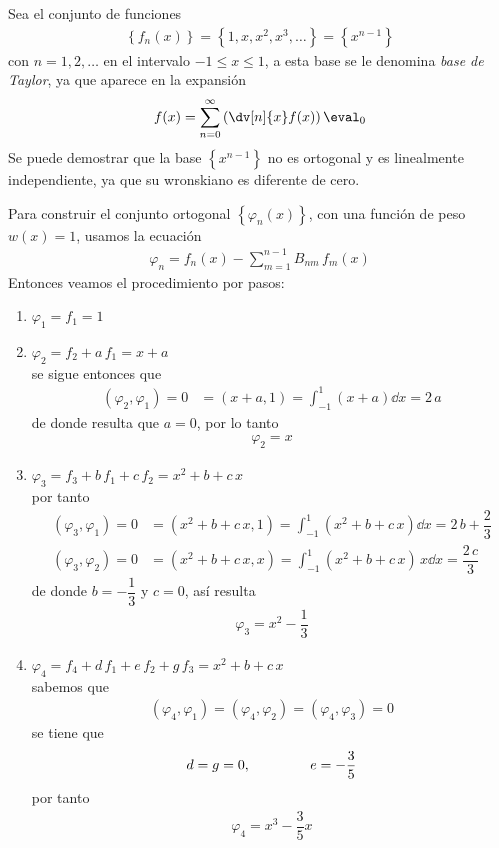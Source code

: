 Sea el conjunto de funciones
\begin{align*}
\left\{ f_{n} (x) \right\} = \left\{ 1, x, x^{2}, x^{3}, \ldots \right\} = \left\{x^{n-1} \right\}
\end{align*}
con $n = 1, 2, \ldots$ en el intervalo $-1 \leq x \leq 1$, a esta base se le denomina \emph{base de Taylor}, ya que aparece en la expansión
\begin{align*}
f(x) = \sum_{n=0}^{\infty} \left( \dv[n]{x} f(x) \right) \eval_{0}
\end{align*}
Se puede demostrar que la base $\left\{x^{n-1} \right\}$ no es ortogonal y es linealmente independiente, ya que su wronskiano es diferente de cero.
\par
Para construir el conjunto ortogonal $\left\{ \varphi_{n} (x) \right\}$, con una función de peso $w(x) = 1$, usamos la ecuación
\begin{align*}
\varphi_{n} = f_{n} (x) - \sum_{m=1}^{n-1} B_{nm} \, f_{m} (x)
\end{align*}
Entonces veamos el procedimiento por pasos:
\begin{enumerate}[label=\alph*)]
\item $\varphi_{1} = f_{1} = 1$
\item $\varphi_{2} = f_{2} + a \, f_{1} = x + a$
\\
se sigue entonces que
\begin{align*}
(\varphi_{2}, \varphi_{1}) = 0 &= (x + a, 1) = \int_{-1}^{1} (x + a) \dd{x} = 2 \, a
\end{align*}
de donde resulta que $a = 0$, por lo tanto
\begin{align*}
\varphi_{2} = x
\end{align*}
\item $\varphi_{3} = f_{3} + b \, f_{1} + c \, f_{2} = x^{2} + b + c \, x$
\\
por tanto
\begin{align*}
(\varphi_{3}, \varphi_{1}) = 0 &= (x^{2} + b + c \, x, 1) = \int_{-1}^{1} (x^{2} + b + c \, x) \dd{x} = 2 \, b + \dfrac{2}{3} \\[1em]
(\varphi_{3}, \varphi_{2}) = 0 &= (x^{2} + b + c \, x, x) = \int_{-1}^{1} (x^{2} + b + c \, x) \, x \dd{x} = \dfrac{2 \, c}{3}
\end{align*}
de donde $b = -\dfrac{1}{3}$ y $c = 0$, así resulta
\begin{align*}
\varphi_{3} = x^{2} - \dfrac{1}{3}
\end{align*}
\item $\varphi_{4} = f_{4} + d \, f_{1} + e \, f_{2} + g \, f_{3} = x^{2} + b + c \, x$
\\
sabemos que 
\begin{align*}
(\varphi_{4}, \varphi_{1}) = (\varphi_{4}, \varphi_{2}) = (\varphi_{4}, \varphi_{3}) = 0
\end{align*}
se tiene que
\begin{align*}
d = g = 0, \hspace{1.5cm} e = - \dfrac{3}{5}
\end{align*}
por tanto
\begin{align*}
\varphi_{4} = x^{3} - \dfrac{3}{5} x
\end{align*}
\end{enumerate}
